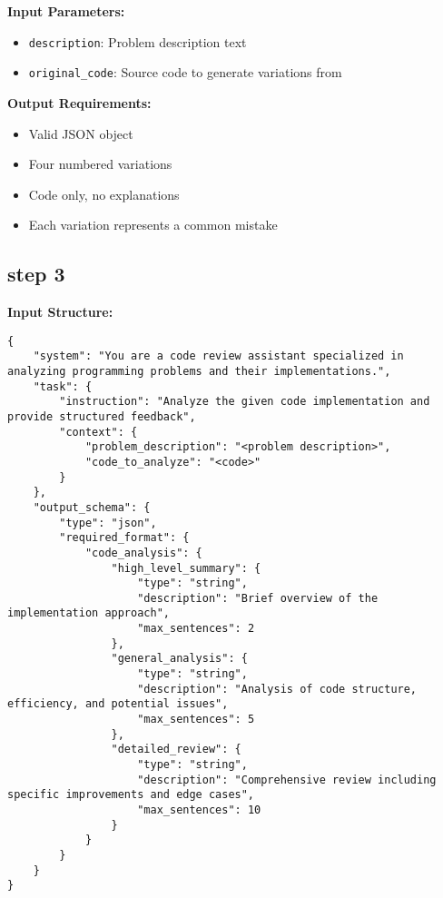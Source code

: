 {\begin{tcolorbox}[
    colback=white,
    colframe=blue!75!black,
    title=Code Variations Generation Prompt,
    fonttitle=\bfseries
]
\textbf{Input Parameters:}
\begin{itemize}
    \item \texttt{description}: Problem description text
    \item \texttt{original\_code}: Source code to generate variations from
\end{itemize}

\textbf{Output Requirements:}
\begin{itemize}
    \item Valid JSON object
    \item Four numbered variations
    \item Code only, no explanations
    \item Each variation represents a common mistake
\end{itemize}
\end{tcolorbox}

\subsection*{step 3}




\begin{tcolorbox}[
    colback=white,
    colframe=blue!75!black,
    title=Code Review Feedback Prompt,
    fonttitle=\bfseries
]
\textbf{Input Structure:}

\begin{lstlisting}[style=jsonStyle]
{
    "system": "You are a code review assistant specialized in analyzing programming problems and their implementations.",
    "task": {
        "instruction": "Analyze the given code implementation and provide structured feedback",
        "context": {
            "problem_description": "<problem description>",
            "code_to_analyze": "<code>"
        }
    },
    "output_schema": {
        "type": "json",
        "required_format": {
            "code_analysis": {
                "high_level_summary": {
                    "type": "string",
                    "description": "Brief overview of the implementation approach",
                    "max_sentences": 2
                },
                "general_analysis": {
                    "type": "string",
                    "description": "Analysis of code structure, efficiency, and potential issues",
                    "max_sentences": 5
                },
                "detailed_review": {
                    "type": "string",
                    "description": "Comprehensive review including specific improvements and edge cases",
                    "max_sentences": 10
                }
            }
        }
    }
}
\end{lstlisting}


\end{tcolorbox}}
